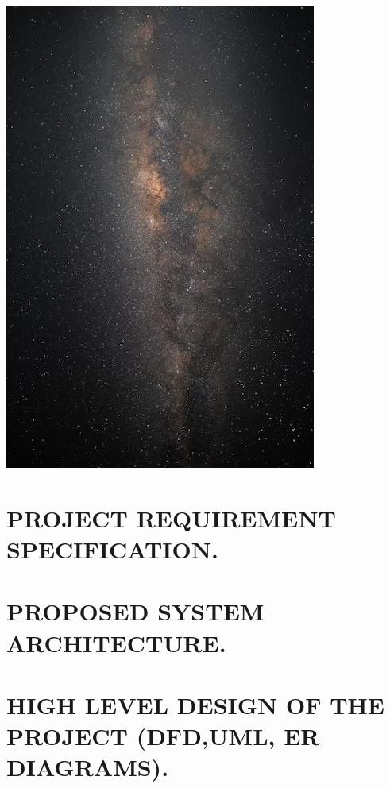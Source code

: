 \documentclass[12pt]{article}
\begin{document}
\includegraphics{universe}


\section{\uppercase{\large{Project Requirement specification.}}}

\section{\uppercase{\large{Proposed system Architecture.}}}

\section{\uppercase{\large{High level design of the project (DFD,UML, ER Diagrams).}}}
\end{document}
